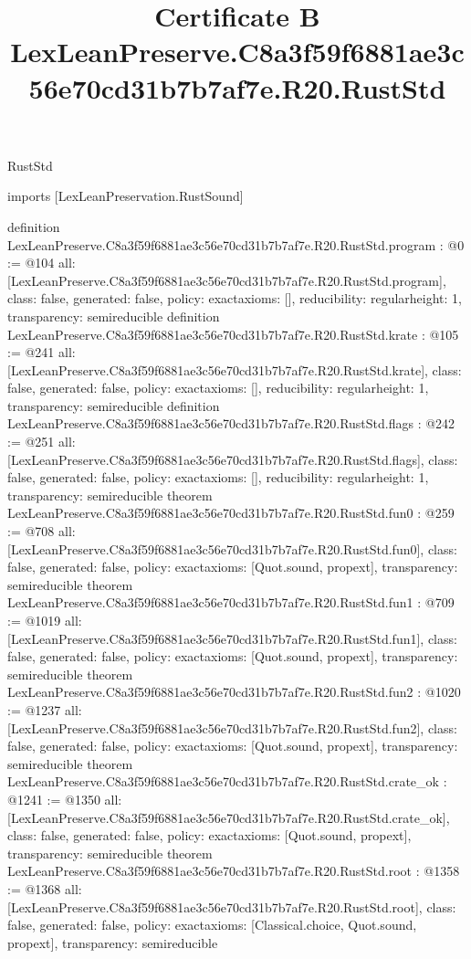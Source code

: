 \begin{lexlean}{RustStd}
\title{Certificate B LexLeanPreserve.C8a3f59f6881ae3c56e70cd31b7b7af7e.R20.RustStd}
\begin{coremodule}
imports [LexLeanPreservation.RustSound]

definition LexLeanPreserve.C8a3f59f6881ae3c56e70cd31b7b7af7e.R20.RustStd.program : @0 := @104 {
  all: [LexLeanPreserve.C8a3f59f6881ae3c56e70cd31b7b7af7e.R20.RustStd.program],
  class: false,
  generated: false,
  policy: exact{axioms: []},
  reducibility: regular{height: 1},
  transparency: semireducible
}
definition LexLeanPreserve.C8a3f59f6881ae3c56e70cd31b7b7af7e.R20.RustStd.krate : @105 := @241 {
  all: [LexLeanPreserve.C8a3f59f6881ae3c56e70cd31b7b7af7e.R20.RustStd.krate],
  class: false,
  generated: false,
  policy: exact{axioms: []},
  reducibility: regular{height: 1},
  transparency: semireducible
}
definition LexLeanPreserve.C8a3f59f6881ae3c56e70cd31b7b7af7e.R20.RustStd.flags : @242 := @251 {
  all: [LexLeanPreserve.C8a3f59f6881ae3c56e70cd31b7b7af7e.R20.RustStd.flags],
  class: false,
  generated: false,
  policy: exact{axioms: []},
  reducibility: regular{height: 1},
  transparency: semireducible
}
theorem LexLeanPreserve.C8a3f59f6881ae3c56e70cd31b7b7af7e.R20.RustStd.fun0 : @259 := @708 {
  all: [LexLeanPreserve.C8a3f59f6881ae3c56e70cd31b7b7af7e.R20.RustStd.fun0],
  class: false,
  generated: false,
  policy: exact{axioms: [Quot.sound, propext]},
  transparency: semireducible
}
theorem LexLeanPreserve.C8a3f59f6881ae3c56e70cd31b7b7af7e.R20.RustStd.fun1 : @709 := @1019 {
  all: [LexLeanPreserve.C8a3f59f6881ae3c56e70cd31b7b7af7e.R20.RustStd.fun1],
  class: false,
  generated: false,
  policy: exact{axioms: [Quot.sound, propext]},
  transparency: semireducible
}
theorem LexLeanPreserve.C8a3f59f6881ae3c56e70cd31b7b7af7e.R20.RustStd.fun2 : @1020 := @1237 {
  all: [LexLeanPreserve.C8a3f59f6881ae3c56e70cd31b7b7af7e.R20.RustStd.fun2],
  class: false,
  generated: false,
  policy: exact{axioms: [Quot.sound, propext]},
  transparency: semireducible
}
theorem LexLeanPreserve.C8a3f59f6881ae3c56e70cd31b7b7af7e.R20.RustStd.crate_ok : @1241 := @1350 {
  all: [LexLeanPreserve.C8a3f59f6881ae3c56e70cd31b7b7af7e.R20.RustStd.crate_ok],
  class: false,
  generated: false,
  policy: exact{axioms: [Quot.sound, propext]},
  transparency: semireducible
}
theorem LexLeanPreserve.C8a3f59f6881ae3c56e70cd31b7b7af7e.R20.RustStd.root : @1358 := @1368 {
  all: [LexLeanPreserve.C8a3f59f6881ae3c56e70cd31b7b7af7e.R20.RustStd.root],
  class: false,
  generated: false,
  policy: exact{axioms: [Classical.choice, Quot.sound, propext]},
  transparency: semireducible
}


\end{coremodule}
\end{lexlean}
